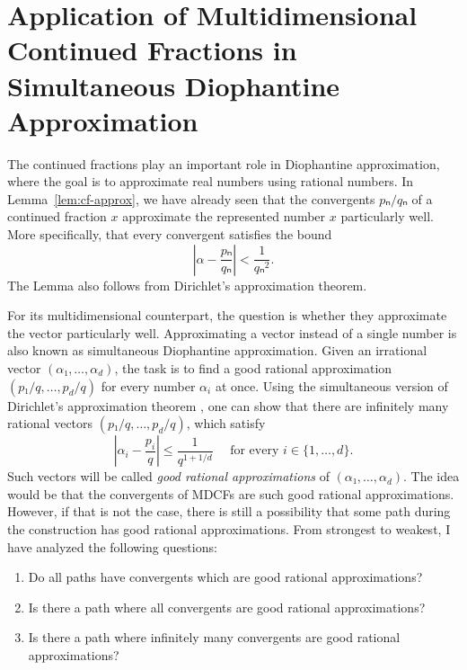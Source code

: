 \section{Application of Multidimensional Continued Fractions in Simultaneous Diophantine Approximation}

The continued fractions play an important role in Diophantine approximation,
where the goal is to approximate real numbers using rational numbers.
In Lemma~\vref{lem:cf-approx}, we have already seen that the convergents
$pₙ/qₙ$ of a continued fraction $x$ approximate the represented number $x$
particularly well.
More specifically, that every convergent satisfies the bound
\[
  \left|α - \frac{pₙ}{qₙ}\right| < \frac{1}{qₙ^2}.
\]
The Lemma also follows from Dirichlet's approximation theorem.

For its multidimensional counterpart,
the question is whether they approximate the vector particularly well.
Approximating a vector instead of a single number is also known as simultaneous
Diophantine approximation.
Given an irrational vector $(α₁, …, α_d)$, the task is to find a good
rational approximation $(p₁/q, …, p_d/q)$ for every number $α_i$ at once.
Using the simultaneous version of Dirichlet's approximation theorem \cite{Schmidt80},
one can show that there are infinitely many rational vectors $(p₁/q, …, p_d/q)$,
which satisfy
\begin{equation}
  \label{eq:sim-approx}
  \left|α_i - \frac{p_i}{q}\right| ≤ \frac{1}{q^{1 + 1/d}}
  \quad
  \text{ for every } i ∈ \{1, …, d\}.
\end{equation}
Such vectors will be called \emph{good rational approximations} of $(α₁, …, α_d)$.
The idea would be that the convergents of MDCFs are such good rational approximations.
However, if that is not the case, there is still a possibility that some path
during the construction has good rational approximations.
From strongest to weakest, I have analyzed the following questions:
\begin{enumerate}
  \item Do all paths have convergents which are good rational approximations?
  \item Is there a path where all convergents are good rational approximations?
  \item Is there a path where infinitely many convergents are good rational approximations?
\end{enumerate}

